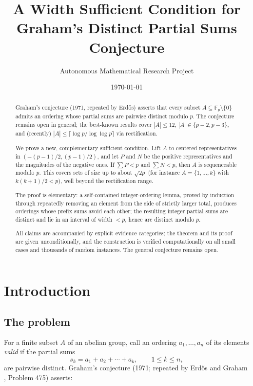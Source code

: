 \documentclass[11pt]{article}
\title{A Width Sufficient Condition for Graham's Distinct Partial Sums Conjecture}
\author{Autonomous Mathematical Research Project}
\date{\today}
\theoremstyle{definition}
\begin{document}
\maketitle

\begin{abstract}
Graham's conjecture (1971, repeated by Erd\H{o}s) asserts that every subset
$A\subseteq\mathbb F_p\setminus\{0\}$ admits an ordering whose partial sums
are pairwise distinct modulo $p$. The conjecture remains open in general; the
best-known results cover $|A|\le 12$, $|A|\in\{p-2,p-3\}$, and (recently)
$|A|\le \lceil \log p/\log\log p\rceil$ via rectification.

We prove a new, complementary sufficient condition. Lift $A$ to centered
representatives in $(-(p-1)/2,(p-1)/2)$, and let $P$ and $N$ be the positive
representatives and the magnitudes of the negative ones. If
$\sum P < p$ and $\sum N < p$, then $A$ is sequenceable
modulo $p$. This covers sets of size up to about $\sqrt{2p}$ (for instance
$A=\{1,\dots,k\}$ with $k(k+1)/2<p$), well beyond the rectification range.

The proof is elementary: a self-contained integer-ordering lemma, proved by
induction through repeatedly removing an element from the side of strictly
larger total, produces orderings whose prefix sums avoid each other; the
resulting integer partial sums are distinct and lie in an interval of width
$<p$, hence are distinct modulo $p$.

All claims are accompanied by explicit evidence categories; the theorem and
its proof are given unconditionally, and the construction is verified
computationally on all small cases and thousands of random instances. The
general conjecture remains open.
\end{abstract}

\section{Introduction}

\subsection{The problem}
For a finite subset $A$ of an abelian group, call an ordering
$a_1,\dots,a_n$ of its elements \emph{valid} if the partial sums
\[
  s_k=a_1+a_2+\cdots+a_k,\qquad 1\le k\le n,
\]
are pairwise distinct. Graham's conjecture (1971; repeated by Erd\H{o}s and
Graham \cite{EG80}, Problem 475) asserts:
\end{document}
